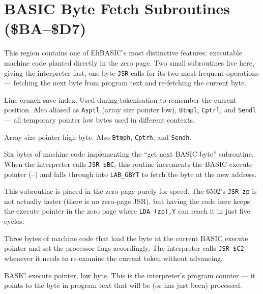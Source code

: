 \section{BASIC Byte Fetch Subroutines (\$BA--\$D7)}

This region contains one of EhBASIC's most distinctive features: executable
machine code planted directly in the zero page.  Two small subroutines live
here, giving the interpreter fast, one-byte \texttt{JSR} calls for its two
most frequent operations --- fetching the next byte from program text and
re-fetching the current byte.


Line crunch save index.  Used during tokenisation to remember the current
position.  Also aliased as \texttt{Asptl} (array size pointer low),
\texttt{Btmpl}, \texttt{Cptrl}, and \texttt{Sendl} --- all temporary pointer
low bytes used in different contexts.


Array size pointer high byte.  Also \texttt{Btmph}, \texttt{Cptrh}, and
\texttt{Sendh}.


Six bytes of machine code implementing the ``get next BASIC byte'' subroutine.
When the interpreter calls \texttt{JSR \$BC}, this routine increments the
BASIC execute pointer (--) and falls through into
\texttt{LAB\_GBYT} to fetch the byte at the new address.

This subroutine is placed in the zero page purely for speed.  The 6502's
\texttt{JSR zp} is not actually faster (there is no zero-page JSR), but
having the code here keeps the execute pointer in the zero page where
\texttt{LDA (zp),Y} can reach it in just five cycles.


Three bytes of machine code that load the byte at the current BASIC execute
pointer and set the processor flags accordingly.  The interpreter calls
\texttt{JSR \$C2} whenever it needs to re-examine the current token without
advancing.


BASIC execute pointer, low byte.  This is the interpreter's program counter
--- it points to the byte in program text that will be (or has just been)
processed.

